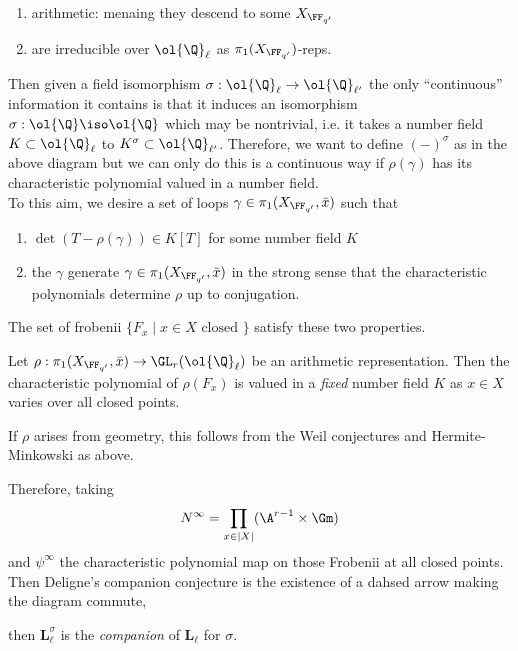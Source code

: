 \documentclass{article}
\newcommand{\Qbar}{\ol{\Q}}
\newcommand{\LL}{\mathbf{L}}
\newcommand{\irr}{\mathrm{irr}}
\begin{document}
\begin{enumerate}
\item arithmetic: menaing they descend to some $X_{\FF_{q'}}$ 
\item are irreducible over $\ol{\Q}_{\ell}$ as $\pi_1(X_{\FF_{q'}})$-reps.
\end{enumerate}
Then given a field isomorphism $\sigma : \Qbar_\ell \to \Qbar_{\ell'}$ the only ``continuous'' information it contains is that it induces an isomorphism $\sigma : \Qbar \iso \Qbar$ which may be nontrivial, i.e. it takes a number field $K \subset \Qbar_\ell$ to $K^\sigma \subset \Qbar_{\ell'}$. Therefore, we want to define $(-)^{\sigma}$ as in the above diagram but we can only do this is a continuous way if $\rho(\gamma)$ has its characteristic polynomial valued in a number field. 
\bigskip\\
To this aim, we desire a set of loops $\gamma \in \pi_1(X_{\FF_{q'}}, \bar{x})$ such that
\begin{enumerate}
\item $\det{(T - \rho(\gamma))} \in K[T]$ for some number field $K$
\item the $\gamma$ generate $\gamma \in \pi_1(X_{\FF_{q'}}, \bar{x})$ in the strong sense that the characteristic polynomials determine $\rho$ up to conjugation. 
\end{enumerate}

The set of frobenii $\{ F_x \mid x \in X \text{ closed } \}$ satisfy these two properties.

\begin{theorem}[Lafforgue]
Let $\rho : \pi_1(X_{\FF_{q'}}, \bar{x}) \to \GL_r(\Qbar_\ell)$ be an arithmetic representation. Then the characteristic polynomial of $\rho(F_x)$ is valued in a \textit{fixed} number field $K$ as $x \in X$ varies over all closed points. 
\end{theorem}

\begin{rmk}
If $\rho$ arises from geometry, this follows from the Weil conjectures and Hermite-Minkowski as above. 
\end{rmk}

Therefore, taking
\[ N^\infty = \prod_{x \in |X|} (\A^{r-1} \times \Gm) \]
and $\psi^\infty$ the characteristic polynomial map on those Frobenii at all closed points. Then Deligne's companion conjecture is the existence of a dahsed arrow making the diagram commute,
\begin{center}
\end{center}
then $\LL_\ell^{\sigma}$ is the \textit{companion} of $\LL_{\ell}$ for $\sigma$.
\end{document}
